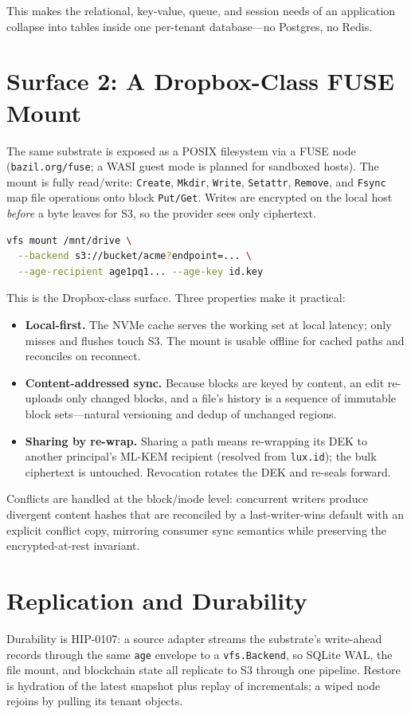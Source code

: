\documentclass[11pt,twocolumn]{article}
\begin{document}
This makes the relational, key-value, queue, and session needs of an application
collapse into tables inside one per-tenant database---no Postgres, no Redis.

\section{Surface 2: A Dropbox-Class FUSE Mount}
The same substrate is exposed as a POSIX filesystem via a FUSE node
(\texttt{bazil.org/fuse}; a WASI guest mode is planned for sandboxed hosts). The
mount is fully read/write: \texttt{Create}, \texttt{Mkdir}, \texttt{Write},
\texttt{Setattr}, \texttt{Remove}, and \texttt{Fsync} map file operations onto
block \texttt{Put/Get}. Writes are encrypted on the local host \emph{before} a
byte leaves for S3, so the provider sees only ciphertext.

\begin{lstlisting}[language=bash,caption={Mounting S3 as an encrypted folder.}]
vfs mount /mnt/drive \
  --backend s3://bucket/acme?endpoint=... \
  --age-recipient age1pq1... --age-key id.key
\end{lstlisting}

This is the Dropbox-class surface. Three properties make it practical:
\begin{itemize}
\item \textbf{Local-first.} The NVMe cache serves the working set at local
latency; only misses and flushes touch S3. The mount is usable offline for cached
paths and reconciles on reconnect.
\item \textbf{Content-addressed sync.} Because blocks are keyed by content, an
edit re-uploads only changed blocks, and a file's history is a sequence of
immutable block sets---natural versioning and dedup of unchanged regions.
\item \textbf{Sharing by re-wrap.} Sharing a path means re-wrapping its DEK to
another principal's ML-KEM recipient (resolved from \texttt{lux.id}); the bulk
ciphertext is untouched. Revocation rotates the DEK and re-seals forward.
\end{itemize}
Conflicts are handled at the block/inode level: concurrent writers produce
divergent content hashes that are reconciled by a last-writer-wins default with
an explicit conflict copy, mirroring consumer sync semantics while preserving the
encrypted-at-rest invariant.

\section{Replication and Durability}
Durability is HIP-0107: a source adapter streams the substrate's write-ahead
records through the same \texttt{age} envelope to a \texttt{vfs.Backend}, so
SQLite WAL, the file mount, and blockchain state all replicate to S3 through one
pipeline. Restore is hydration of the latest snapshot plus replay of
incrementals; a wiped node rejoins by pulling its tenant objects.
\end{document}
